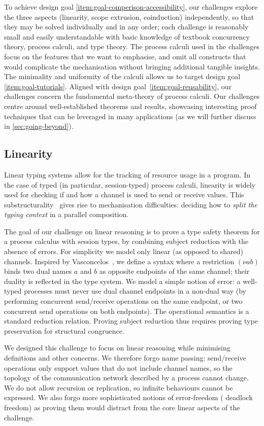 \documentclass[runningheads]{llncs}
\begin{document}
To achieve design goal \ref{item:goal-comperison-accessibility}, our challenges explore the three aspects
(linearity, scope extrusion, coinduction) independently, so that they
may be solved individually and in any order; each challenge is
reasonably small and easily understandable with basic knowledge of
textbook concurrency theory, process calculi, and type theory.  The
process calculi used in the challenges focus on the features that
we want to emphasise, and omit all constructs that would complicate the mechanisation without bringing additional
tangible insights.  The minimality and uniformity of the
calculi allows us to target design goal
\ref{item:goal-tutorials}.
Aligned with design goal~\ref{item:goal-reusability}, our challenges concern the fundamental meta-theory of process calculi.
Our challenges centre around well-established theorems and results, showcasing interesting proof techniques that can be leveraged in many applications (as we will further discuss in \cref{sec:going-beyond}).

\subsection{Linearity}
Linear typing systems allow for the tracking of resource usage in a program. In
the case of typed (in particular, session-typed) process calculi, linearity is
widely used for checking if and how a channel is used to send or receive values.
This substructurality~\cite[Ch. 1]{Pierce2004-oq} gives rise to mechanisation difficulties: \eg deciding how to \emph{split the
typing context} in a parallel composition.

The goal of our challenge on linear reasoning is to prove a type safety theorem
for a process calculus with session types, by combining subject
reduction with the absence of errors.  For simplicity we model only linear (as
opposed to shared) channels. Inspired by Vasconcelos~\cite{Vasconcelos2012}, we
define a syntax where a restriction $(\nu ab)$ binds two dual names $a$
and $b$ as opposite endpoints of the same channel; their duality is
reflected in the type system. We model a simple notion of error: a well-typed
processes must never use dual channel endpoints in a non-dual way (\eg by
performing concurrent send/receive operations on the same endpoint, or two
concurrent send operations on both endpoints).
The operational semantics is a standard reduction relation. Proving subject reduction thus requires proving type preservation for structural congruence.

We designed this challenge to focus on linear reasoning while minimising
definitions and other concerns.  We therefore forgo name passing:
send/receive operations only support values that do not include channel names, so
the topology of the communication network described by a process cannot change.
We do not allow recursion or replication, so infinite behaviours cannot be
expressed. We also forgo more sophisticated notions of error-freedom (\eg
deadlock freedom) as proving them would distract from the core linear
aspects of the challenge.
\end{document}

